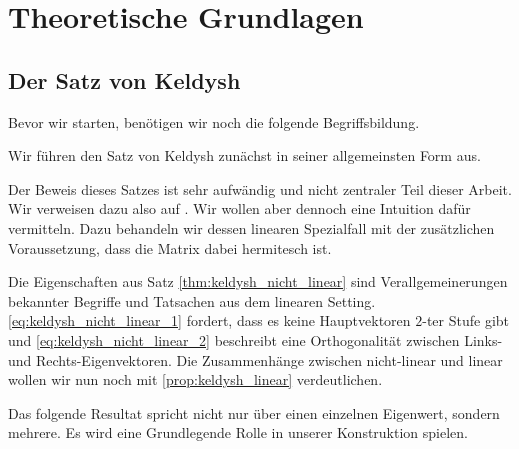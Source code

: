 \chapter{Theoretische Grundlagen}

\section{Der Satz von Keldysh}

Bevor wir starten, benötigen wir noch die folgende Begriffsbildung.




Wir führen den Satz von Keldysh zunächst in seiner allgemeinsten Form aus.



Der Beweis dieses Satzes ist sehr aufwändig und nicht zentraler Teil dieser Arbeit.
Wir verweisen dazu also auf \cite{BEYN20123839}.
Wir wollen aber dennoch eine Intuition dafür vermitteln.
Dazu behandeln wir dessen linearen Spezialfall mit der zusätzlichen Voraussetzung, dass die Matrix dabei hermitesch ist.



Die Eigenschaften aus Satz \ref{thm:keldysh_nicht_linear} sind Verallgemeinerungen bekannter Begriffe und Tatsachen aus dem linearen Setting.
\eqref{eq:keldysh_nicht_linear_1} fordert, dass es keine Hauptvektoren $2$-ter Stufe gibt und \eqref{eq:keldysh_nicht_linear_2} beschreibt eine Orthogonalität zwischen Links- und Rechts-Eigenvektoren.
Die Zusammenhänge zwischen nicht-linear und linear wollen wir nun noch mit \ref{prop:keldysh_linear} verdeutlichen.





% 

% 
% 

Das folgende Resultat spricht nicht nur über einen einzelnen Eigenwert, sondern mehrere.
Es wird eine Grundlegende Rolle in unserer Konstruktion spielen.



